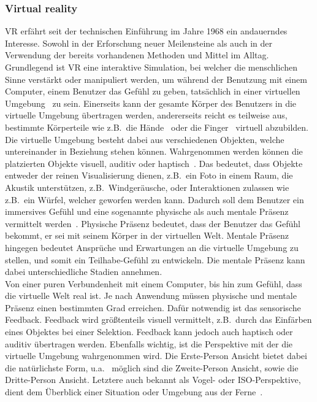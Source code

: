 \subsubsection{Virtual reality}
VR erfährt seit der technischen Einführung im Jahre 1968 ein andauerndes Interesse. Sowohl in der Erforschung neuer Meilensteine als auch in der Verwendung der bereits vorhandenen Methoden und Mittel im Alltag. Grundlegend ist VR eine interaktive Simulation, bei welcher die menschlichen Sinne verstärkt oder manipuliert werden, um während der Benutzung mit einem Computer, einem Benutzer das Gefühl zu geben, tatsächlich in einer virtuellen Umgebung~\cite{virtualreality} zu sein. Einerseits kann der gesamte Körper des Benutzers in die virtuelle Umgebung übertragen werden, andererseits reicht es teilweise aus, bestimmte Körperteile wie z.B.~die Hände~\cite{handtracking} oder die Finger~\cite{fingertracking} virtuell abzubilden. Die virtuelle Umgebung besteht dabei aus verschiedenen Objekten, welche untereinander in Beziehung stehen können. Wahrgenommen werden können die platzierten Objekte visuell, auditiv oder haptisch~\cite{virtualreality}. Das bedeutet, dass Objekte entweder der reinen Visualisierung dienen, z.B.~ein Foto in einem Raum, die Akustik unterstützen, z.B.~Windgeräusche, oder Interaktionen zulassen wie z.B.~ein Würfel, welcher geworfen werden kann. Dadurch soll dem Benutzer ein immersives Gefühl und eine sogenannte physische als auch mentale Präsenz vermittelt werden~\cite{hmds}. Physische Präsenz bedeutet, dass der Benutzer das Gefühl bekommt, er sei mit seinem Körper in der virtuellen Welt. Mentale Präsenz hingegen bedeutet Ansprüche und Erwartungen an die virtuelle Umgebung zu stellen, und somit ein Teilhabe-Gefühl zu entwickeln. Die mentale Präsenz kann dabei unterschiedliche Stadien annehmen.\\
Von einer puren Verbundenheit mit einem Computer, bis hin zum Gefühl, dass die virtuelle Welt real ist. Je nach Anwendung müssen physische und mentale Präsenz einen bestimmten Grad erreichen. Dafür notwendig ist das sensorische Feedback. Feedback wird größtenteils visuell vermittelt, z.B.~durch das Einfärben eines Objektes bei einer Selektion. Feedback kann jedoch auch haptisch oder auditiv übertragen werden. Ebenfalls wichtig, ist die Perspektive mit der die virtuelle Umgebung wahrgenommen wird. Die Erste-Person Ansicht bietet dabei die natürlichste Form, u.a.~ möglich sind die Zweite-Person Ansicht, sowie die Dritte-Person Ansicht. Letztere auch bekannt als Vogel- oder ISO-Perspektive, dient dem Überblick einer Situation oder Umgebung aus der Ferne~\cite{virtualreality}.\\

